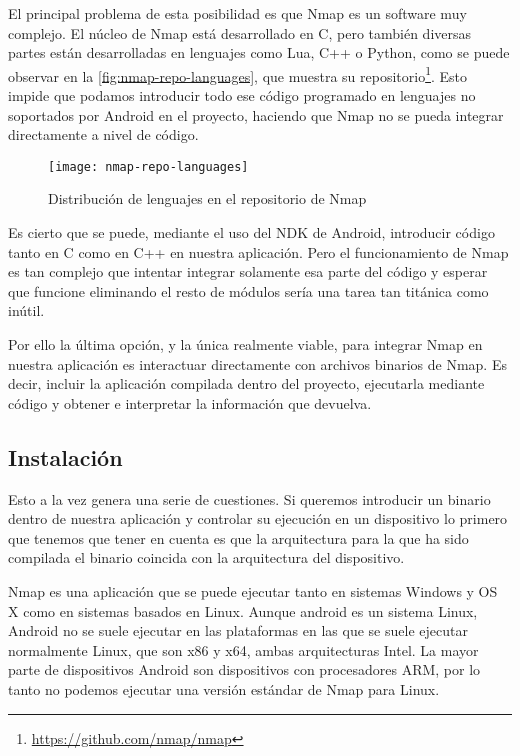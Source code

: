El principal problema de esta posibilidad es que Nmap es un software muy complejo. El núcleo de Nmap está desarrollado en C, pero también diversas partes están desarrolladas en lenguajes como Lua, C++ o Python, como se puede observar en la \autoref{fig:nmap-repo-languages}, que muestra su repositorio\footnote{\url{https://github.com/nmap/nmap}}. Esto impide que podamos introducir todo ese código programado en lenguajes no soportados por Android en el proyecto, haciendo que Nmap no se pueda integrar directamente a nivel de código.

\begin{figure}[H]
	\centering
	\texttt{[image: nmap-repo-languages]}
	\caption{Distribución de lenguajes en el repositorio de Nmap}
	\label{fig:nmap-repo-languages}
\end{figure}

Es cierto que se puede, mediante el uso del NDK de Android, introducir código tanto en C como en C++ en nuestra aplicación. Pero el funcionamiento de Nmap es tan complejo que intentar integrar solamente esa parte del código y esperar que funcione eliminando el resto de módulos sería una tarea tan titánica como inútil.

Por ello la última opción, y la única realmente viable, para integrar Nmap en nuestra aplicación es interactuar directamente con archivos binarios de Nmap. Es decir, incluir la aplicación compilada dentro del proyecto, ejecutarla mediante código y obtener e interpretar la información que devuelva.

\subsection{Instalación}

Esto a la vez genera una serie de cuestiones. Si queremos introducir un binario dentro de nuestra aplicación y controlar su ejecución en un dispositivo lo primero que tenemos que tener en cuenta es que la arquitectura para la que ha sido compilada el binario coincida con la arquitectura del dispositivo.

Nmap  es una aplicación que se puede ejecutar tanto en sistemas Windows y OS X como en sistemas basados en Linux. Aunque android es un sistema Linux, Android no se suele ejecutar en las plataformas en las que se suele ejecutar normalmente Linux, que son x86 y x64, ambas arquitecturas Intel. La mayor parte de dispositivos Android son dispositivos con procesadores ARM, por lo tanto no podemos ejecutar una versión estándar de Nmap para Linux.

